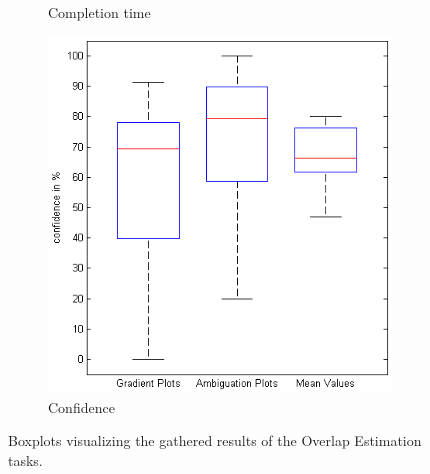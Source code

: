 \begin{figure}[H]
\begin{subfigure}[b]{0.32\textwidth}
        \caption{Completion time}
        \label{fig:s4_time}
    \end{subfigure}
		\begin{subfigure}[b]{0.32\textwidth}
        \includegraphics[width=\textwidth]{figures/boxplots/s4_confidence.png}
        \caption{Confidence}
        \label{fig:s4_confidence}
    \end{subfigure}
    \caption{Boxplots visualizing the gathered results of the Overlap Estimation tasks.}
		\label{fig:s4_boxplots}
\end{figure}